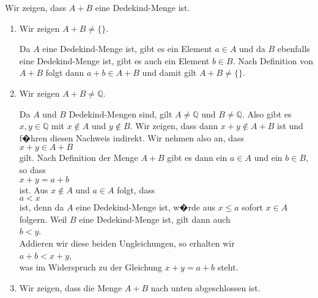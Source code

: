 \solution
Wir zeigen, dass $A + B$ eine Dedekind-Menge ist.
\begin{enumerate}
\item Wir zeigen $A + B \not= \{\}$.

      Da $A$ eine Dedekind-Menge ist, gibt es ein Element $a \in A$ und da $B$ ebenfalls eine
      Dedekind-Menge ist, gibt es auch ein Element $b \in B$.  Nach Definition von $A + B$ folgt dann
      $a + b \in A + B$ und damit gilt $A + B \not= \{\}$.
\item Wir zeigen $A + B \not= \mathbb{Q}$.

      Da $A$ und $B$ Dedekind-Mengen sind, gilt $A \not= \mathbb{Q}$ und $B \not= \mathbb{Q}$.  Also gibt es 
      $x,y \in \mathbb{Q}$ mit $x \not\in A$ und $y \not\in B$.  Wir zeigen, dass dann  $x + y \not\in A + B$
      ist und f�hren diesen Nachweis indirekt.  Wir nehmen also an, dass
      \\[0.2cm]
      \hspace*{1.3cm}
      $x + y \in A + B$
      \\[0.2cm]
      gilt.  Nach Definition der Menge $A + B$ gibt es dann ein $a \in A$ und ein $b \in B$, so dass
      \\[0.2cm]
      \hspace*{1.3cm}
      $x + y = a + b$
      \\[0.2cm]
      ist.  Aus $x \not\in A$ und $a \in A$ folgt, dass 
      \\[0.2cm]
      \hspace*{1.3cm}
      $a < x$ 
      \\[0.2cm]
      ist, denn da $A$ eine Dedekind-Menge ist, w�rde aus $x \leq a$ sofort $x \in A$ folgern.  Weil $B$ eine
      Dedekind-Menge ist, gilt dann auch
      \\[0.2cm]
      \hspace*{1.3cm}
      $b < y$.
      \\[0.2cm]
      Addieren wir diese beiden Ungleichungen, so erhalten wir
      \\[0.2cm]
      \hspace*{1.3cm}
      $a + b < x + y$,
      \\[0.2cm]
      was im Widerspruch zu der Gleichung $x + y = a + b$ steht.
\item Wir zeigen, dass die Menge $A + B$ nach unten abgeschlossen ist.


\end{enumerate}
